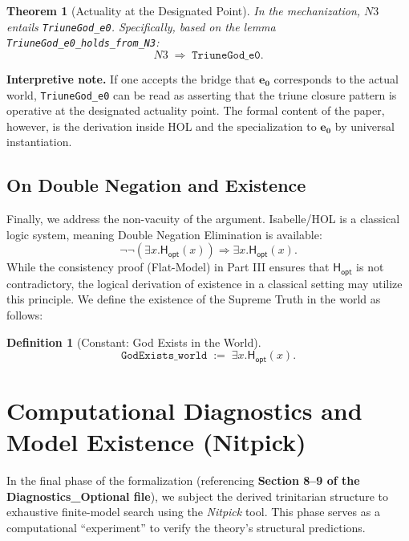 \documentclass[a4paper, 11pt]{article}
\theoremstyle{plain}
\newtheorem{theorem}{Theorem}[section]
\theoremstyle{definition}
\newtheorem{definition}{Definition}[section]
\newcommand{\Hopt}{\mathsf{H_{opt}}}       %
\newcommand{\eZero}{\mathbf{e_0}}         %
\begin{document}
\begin{theorem}[Actuality at the Designated Point]
\label{thm:TriuneGod_e0}
In the mechanization, $N3$ entails \texttt{TriuneGod\_e0}. Specifically, based on the lemma \texttt{TriuneGod\_e0\_holds\_from\_N3}:
\[
N3 \;\Longrightarrow\; \texttt{TriuneGod\_e0}.
\]
\end{theorem}

\noindent\textbf{Interpretive note.}
If one accepts the bridge that $\eZero$ corresponds to the actual world, \texttt{TriuneGod\_e0} can be read as asserting that the triune closure pattern is operative at the designated actuality point. The formal content of the paper, however, is the derivation inside HOL and the specialization to $\eZero$ by universal instantiation.

\subsection{On Double Negation and Existence}

Finally, we address the non-vacuity of the argument. Isabelle/HOL is a classical logic system, meaning Double Negation Elimination is available:
\[
\neg\neg(\exists x.\Hopt(x)) \Longrightarrow \exists x.\Hopt(x).
\]
While the consistency proof (Flat-Model) in Part III ensures that $\Hopt$ is not contradictory, the logical derivation of existence in a classical setting may utilize this principle. We define the existence of the Supreme Truth in the world as follows:

\begin{definition}[Constant: God Exists in the World]
\[
\texttt{GodExists\_world}\;:=\;\exists x.\Hopt(x).
\]
\end{definition}

\newpage


\section{Computational Diagnostics and Model Existence (Nitpick)}
\label{sec:nitpick_analysis}

In the final phase of the formalization (referencing \textbf{Section 8--9 of the Diagnostics\_Optional file}), we subject the derived trinitarian structure to exhaustive finite-model search using the \textit{Nitpick} tool. This phase serves as a computational ``experiment'' to verify the theory's structural predictions.
\end{document}
